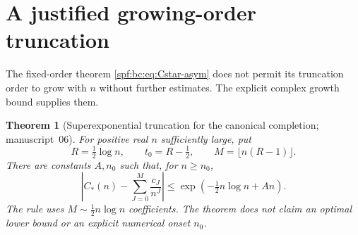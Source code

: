 \documentclass[11pt]{article}
\numberwithin{equation}{section}
\newtheorem{theorem}{Theorem}[section]
\theoremstyle{definition}
\theoremstyle{remark}
\theoremstyle{definition}
\newcommand{\bcC}{C_{\!*}}
\begin{document}
\section{A justified growing-order truncation}
\label{spf:bc:sec:truncation}

The fixed-order theorem \eqref{spf:bc:eq:Cstar-asym} does not permit its truncation
order to grow with $n$ without further estimates. The explicit complex growth
bound supplies them.

\begin{theorem}[Superexponential truncation for the canonical completion; manuscript~06]
\label{spf:bc:thm:truncation}
For positive real $n$ sufficiently large, put
\begin{equation}
 R=\tfrac12\log n,\qquad t_0=R-\tfrac12,\qquad
 M=\lfloor n(R-1)\rfloor.
 \label{spf:bc:eq:truncation-rule}
\end{equation}
There are constants $A,n_0$ such that, for $n\ge n_0$,
\begin{equation}
 \boxed{\left|\bcC(n)-\sum_{J=0}^{M}\frac{c_J}{n^J}\right|
       \le\exp\!\left(-\tfrac12n\log n+An\right).}
 \label{spf:bc:eq:truncation}
\end{equation}
The rule uses $M\sim\tfrac12n\log n$ coefficients. The theorem does not
claim an optimal lower bound or an explicit numerical onset $n_0$.
\end{theorem}
\end{document}
